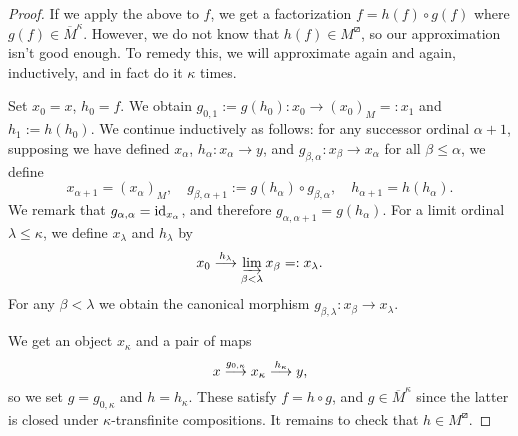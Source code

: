 \begin{proof}
If we apply the above to \(f\), we get a factorization \(f = h(f)\circ g(f)\) where \(g(f) \in \overline{M}^\kappa\). However, we do not know that \(h(f)\in M^\boxslash\),
so our approximation isn't good enough. To remedy this, we will approximate again and again, inductively, and in fact do it \(\kappa\) times.

Set \(x_0 = x\), \(h_0 = f\). We obtain \(g_{0,1} := g(h_0)\!:x_0 \to (x_0)_M =: x_1\) and \(h_1 := h(h_0)\). We continue inductively as follows: for any successor ordinal
\(\alpha+1\), supposing we have defined \(x_\alpha\), \(h_\alpha\!:x_{\alpha}\to y\), and \(g_{\beta,\alpha}\!:x_{\beta}\to x_{\alpha} \) for all \(\beta \leq \alpha\), we define
\[ x_{\alpha+1} = (x_\alpha)_M,\quad g_{\beta,\alpha+1} := g(h_\alpha)\circ g_{\beta,\alpha},\quad h_{\alpha+1} = h(h_\alpha). \]
We remark that \(g_{\alpha,\alpha} = \mathrm{id}_{x_\alpha}\), and therefore \(g_{\alpha,\alpha+1} = g(h_\alpha)\). For a limit ordinal \(\lambda \leq \kappa\), we define \(x_\lambda\) and \(h_\lambda\) by
\[ x_0 \overset{h_\lambda}{\longrightarrow} \varinjlim_{\beta < \lambda}x_\beta =: x_\lambda. \]
For any \(\beta < \lambda\) we obtain the canonical morphism \(g_{\beta,\lambda}\!:x_\beta \to x_\lambda\).

We get an object \(x_\kappa\) and a pair of maps
\[ x \overset{g_{0,\kappa}}{\longrightarrow} x_\kappa \overset{h_\kappa}{\longrightarrow} y, \]
so we set \(g = g_{0,\kappa }\) and \(h = h_\kappa\). These satisfy \(f = h\circ g\), and \(g\in\overline{M}^\kappa\) since the latter is closed under \(\kappa\)-transfinite compositions.
It remains to check that \(h\in M^\boxslash\).


\end{proof}
